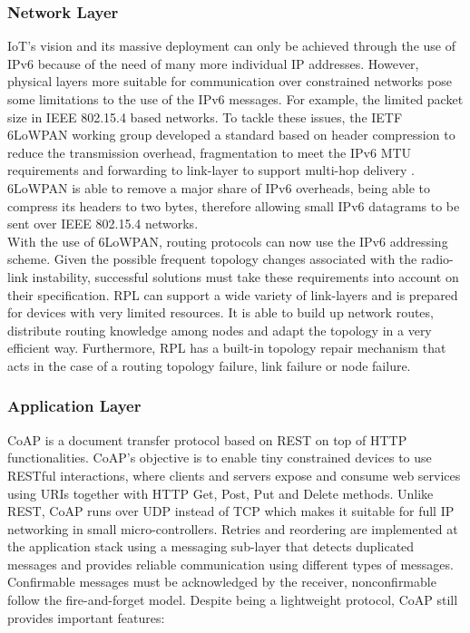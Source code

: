\documentclass{sig-alternate-05-2015}
\begin{document}
\subsubsection{Network Layer}
\label{sec:network_layer}
\gls{IoT}'s vision and its massive deployment can only be achieved through the use of IPv6 \cite{Pickard2015} because of the need of many more individual IP addresses. 
However, physical layers more suitable for communication over constrained networks pose some limitations to the use of the IPv6 messages. 
For example, the limited packet size in IEEE 802.15.4 based networks. 
To tackle these issues, the \gls{IETF} \gls{6LoWPAN} \cite{Shelby2012} working group developed a standard based on header compression to reduce the transmission overhead, fragmentation to meet the IPv6 \gls{MTU} requirements and forwarding to link-layer to support multi-hop delivery \cite{Hui2008}. 
\gls{6LoWPAN} is able to remove a major share of IPv6 overheads, being able to compress its headers to two bytes, therefore allowing small IPv6 datagrams to be sent over IEEE 802.15.4 networks. \\
With the use of 6LoWPAN, routing protocols can now use the IPv6 addressing scheme. 
Given the possible frequent topology changes associated with the radio-link instability, successful solutions must take these requirements into account on their specification.
\gls{RPL} \cite{Winter2012} can support a wide variety of link-layers and is prepared for devices with very limited resources. 
It is able to build up network routes, distribute routing knowledge among nodes and adapt the topology in a very efficient way. 
Furthermore, \gls{RPL} has a built-in topology repair mechanism that acts in the case of a routing topology failure, link failure or node failure.

\subsubsection{Application Layer}
\gls{CoAP} \cite{Shelby2014} is a document transfer protocol based on \gls{REST} on top of \gls{HTTP} functionalities. 
\gls{CoAP}'s objective is to enable tiny constrained devices to use RESTful interactions, where clients and servers expose and consume web services using \gls{URIs} together with  \gls{HTTP} Get, Post, Put and Delete methods. 
Unlike \gls{REST}, \gls{CoAP} runs over \gls{UDP} instead of \gls{TCP} which makes it suitable for full IP networking in small micro-controllers. 
Retries and reordering are implemented at the application stack using a messaging sub-layer that detects duplicated messages and provides reliable communication using different types of messages. 
Confirmable messages must be acknowledged by the receiver, nonconfirmable follow the fire-and-forget model. 
Despite being a lightweight protocol, \gls{CoAP} still provides important features:
	
\end{document}
